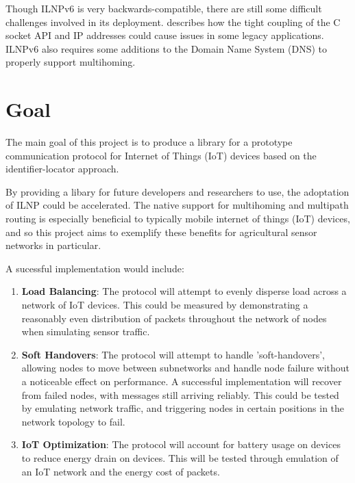 \documentclass[12pt]{article}
\begin{document}
Though ILNPv6 is very backwards-compatible, there are still some difficult challenges involved in its deployment. \cite{ipwithoutip} describes how the tight coupling of the C socket API and IP addresses could cause issues in some legacy applications. ILNPv6 also requires some additions to the Domain Name System (DNS) to properly support multihoming.

\section{Goal} \label{ssec:goal}

The main goal of this project is to produce a library for a prototype communication
protocol for Internet of Things (IoT) devices based on the identifier-locator
approach. 

By providing a libary for future developers and researchers to use, the adoptation of ILNP could be accelerated. The native support for multihoming and multipath routing is especially beneficial to typically mobile internet of things (IoT) devices, and so this project aims to exemplify these benefits for agricultural sensor networks in particular. 

\vspace{\baselineskip}
\noindent A sucessful implementation would include:

\begin{enumerate}
	\item \textbf{Load Balancing}: The protocol will attempt to evenly disperse load across a network of IoT
devices. This could be measured by demonstrating a reasonably even distribution of packets throughout the network of nodes when simulating sensor traffic. 
	\item \textbf{Soft Handovers}: The protocol will attempt to handle ’soft-handovers’, allowing nodes to
move between subnetworks and handle node failure without a noticeable effect on performance. A successful implementation will recover from failed nodes, with messages still arriving reliably. This could be tested by emulating network traffic, and triggering nodes in certain positions in the network topology to fail.

\item \textbf{IoT Optimization}: The protocol will account for battery usage on devices to reduce energy drain
on devices. This will be tested through emulation of an IoT network and the energy cost of packets.
\end{enumerate}
\end{document}
